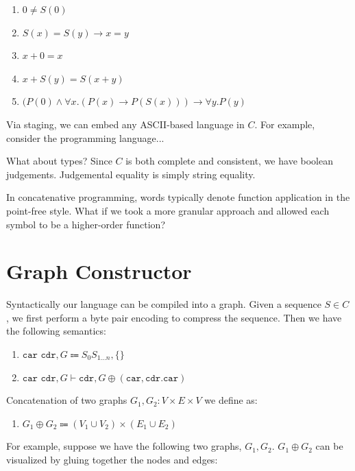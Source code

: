 \documentclass[sigplan,10pt,review,anonymous]{acmart}
\begin{document}
\begin{enumerate}
  \item $0 \neq S(0)            $
  \item $S(x) = S(y) \rightarrow x = y    $
  \item $x + 0 = x              $
  \item $x + S(y) = S(x + y)    $
  \item $(P(0) \land \forall x.(P(x) \rightarrow P(S(x))) \rightarrow \forall y.P(y)$
\end{enumerate}

Via staging, we can embed any ASCII-based language in $C$. For example, consider the programming language...

What about types? Since $C$ is both complete and consistent, we have boolean judgements. Judgemental equality is simply string equality.

In concatenative programming, words typically denote function application in the point-free style. What if we took a more granular approach and allowed each symbol to be a higher-order function?

\section{Graph Constructor}

Syntactically our language can be compiled into a graph. Given a sequence $S\in C$, we first perform a byte pair encoding to compress the sequence. Then we have the following semantics:

\begin{enumerate}
  \item $\texttt{car cdr}, G \Coloneqq S_0 S_{1\ldots n}, \{\}$
  \item $\texttt{car cdr}, G \vdash \texttt{cdr}, G \oplus (\texttt{car}, \texttt{cdr.car})$
\end{enumerate}

Concatenation of two graphs $G_1, G_2: V\times E \times V$ we define as:

\begin{enumerate}
  \item $G_1 \oplus G_2 \Coloneqq (V_1\cup V_2)\times (E_1\cup E_2) $
\end{enumerate}

For example, suppose we have the following two graphs, $G_1, G_2$. $G_1 \oplus G_2$ can be visualized by gluing together the nodes and edges:\\
\end{document}
